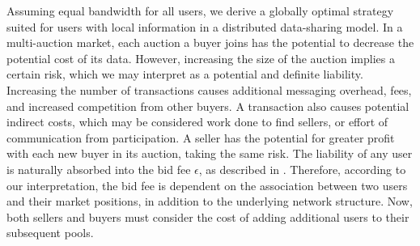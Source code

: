 Assuming equal bandwidth for all users, we derive a globally optimal strategy suited for
users with local information in a distributed data-sharing model. 
In a multi-auction market, each auction a buyer joins has the potential to
decrease the potential cost of its data. However, increasing the size of the
auction implies a certain risk, which we may interpret as a potential and
definite
liability. Increasing the number of transactions causes additional messaging
overhead, fees, and increased competition from other buyers. 
A transaction also causes potential indirect costs, which may be considered work done to find
sellers, or effort of communication from participation. A seller
has the potential for greater profit with each new buyer in its auction, taking 
the same risk.
The liability of any user is naturally absorbed into the bid fee $\epsilon$,
as described in \cite{semret}. Therefore, according to our interpretation, the bid fee is
dependent on the association between two users and their market positions, in
addition to the underlying network structure. Now, both sellers and buyers must consider
the cost of adding additional users to their subsequent pools. 

